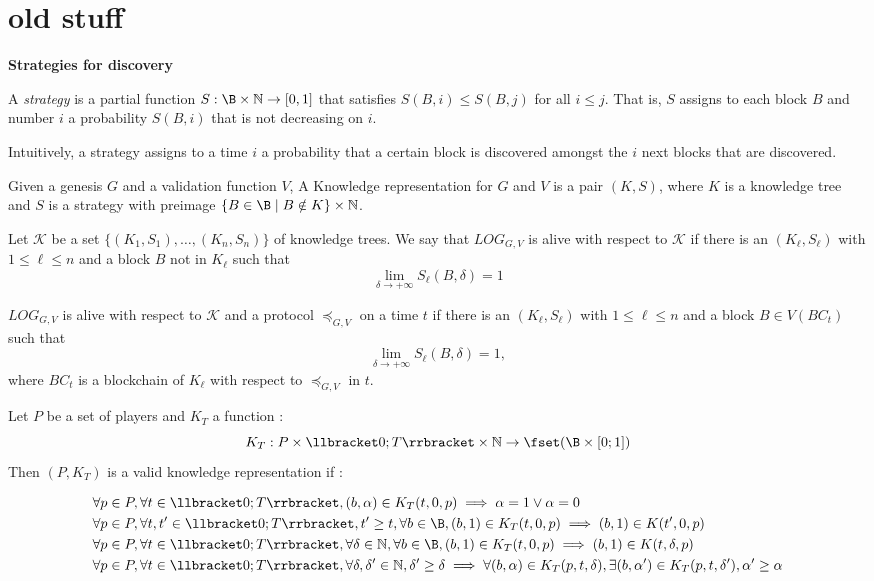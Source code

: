 \section{old stuff}

\medskip
\noindent
\textbf{Strategies for discovery}

\begin{mydef}
	A \emph{strategy} is a partial function $S: \B \times \mathbb{N} \rightarrow [0,1]$ that 
	satisfies $S(B,i) \leq S(B,j)$ for all $i \leq j$. That is, $S$ assigns 
	to each block $B$ and number $i$ a probability $S(B,i)$ that is not decreasing on $i$. 
\end{mydef}

Intuitively, a strategy assigns to a time $i$ a probability that a certain block is discovered amongst the 
$i$ next blocks that are discovered. 

\begin{mydef}
	Given a genesis $G$ and a validation function $V$, 
	A Knowledge representation for $G$ and $V$ is a pair $(K,S)$, where $K$ is a knowledge tree and 
	$S$ is a strategy with preimage $\{B \in \B \mid B \notin K\} \times \mathbb N$. 
\end{mydef}

Let $\mathcal K$ be a set $\{(K_1,S_1),\dots,(K_n,S_n)\}$ of knowledge trees. 
We say that $LOG_{G,V}$ is alive with respect to $\mathcal K$ if there is an $(K_\ell,S_\ell)$ with $1 \leq \ell \leq n$ 
and a block $B$ not in $K_\ell$ such that 
$$\lim\limits_{\delta\rightarrow +\infty}S_\ell(B,\delta) = 1$$

$LOG_{G,V}$ is alive with respect to $\mathcal K$ and a protocol $\preceq_{G,V}$ on a time $t$
if there is an $(K_\ell,S_\ell)$ with $1 \leq \ell \leq n$ 
and a block $B \in V(BC_t)$ such that 
$$\lim\limits_{\delta\rightarrow +\infty}S_\ell(B,\delta) = 1, $$
where $BC_t$ is a blockchain of $K_\ell$ with respect to $\preceq_{G,V}$ in $t$.

\begin{mydef}
Let $P$ be a set of players and $K_T$ a function :
$$K_{T} : P \times \llbracket 0;T \rrbracket \times \mathbb{N} \rightarrow \fset(\B \times [0;1])$$ 
Then $(P,K_{T})$ is a valid knowledge representation if :

\begin{eqnarray*}
&\forall p \in P,\forall t\in \llbracket 0;T \rrbracket, (b,\alpha) \in K_{T}(t,0,p) \implies \alpha = 1 \lor \alpha = 0\\
&\forall p \in P,\forall t,t'\in \llbracket 0;T \rrbracket, t' \geq t, \forall b \in \B,  (b,1) \in K_{T}(t,0,p) \implies (b,1) \in K(t',0,p)  \\
&\forall p \in P,\forall t\in \llbracket 0;T \rrbracket, \forall \delta \in \mathbb{N}, \forall b \in \B,  (b,1) \in K_{T}(t,0,p) \implies (b,1) \in K(t,\delta,p) \\
&\forall p \in P,\forall t\in \llbracket 0;T \rrbracket, \forall \delta,\delta' \in \mathbb{N}, \delta' \geq \delta \implies \forall (b,\alpha) \in K_{T}(p,t,\delta), \exists (b,\alpha') \in K_{T}(p,t,\delta'), \alpha'\geq \alpha\\
\end{eqnarray*}
\end{mydef}

